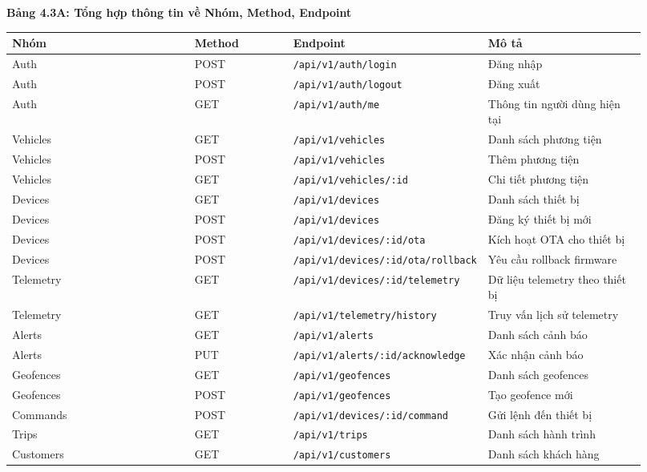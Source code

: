 \documentclass[13pt,a4paper]{extarticle}
\newcounter{none} %
\newcommand{\thesislongtableorignewline}{}
\let\thesislongtableorignewline\\
\renewcommand{\\}{\thesislongtableorignewline\hline}%
\let\\\thesislongtableorignewline
\newcommand{\thesistabletitle}[1]{%
  \begin{center}\textbf{#1}\end{center}%
}
\begin{document}
{\def\LTcaptype{none} %
\thesistabletitle{Bảng 4.3A: Tổng hợp thông tin về Nhóm, Method, Endpoint}

\begin{longtable}{|p{0.30\linewidth}|p{0.16\linewidth}|p{0.20\linewidth}|p{0.26\linewidth}|}
\hline \textbf{Nhóm} & \textbf{Method} & \textbf{Endpoint} & \textbf{Mô tả} \\
\hline
\endhead
\hline
\endlastfoot
Auth & POST & \texttt{/api/v1/auth/login} & Đăng nhập \\
Auth & POST & \texttt{/api/v1/auth/logout} & Đăng xuất \\
Auth & GET & \texttt{/api/v1/auth/me} & Thông tin người dùng hiện tại \\
Vehicles & GET & \texttt{/api/v1/vehicles} & Danh sách phương tiện \\
Vehicles & POST & \texttt{/api/v1/vehicles} & Thêm phương tiện \\
Vehicles & GET & \texttt{/api/v1/vehicles/:id} & Chi tiết phương tiện \\
Devices & GET & \texttt{/api/v1/devices} & Danh sách thiết bị \\
Devices & POST & \texttt{/api/v1/devices} & Đăng ký thiết bị mới \\
Devices & POST & \texttt{/api/v1/devices/:id/ota} & Kích hoạt OTA cho
thiết bị \\
Devices & POST & \nolinkurl{/api/v1/devices/:id/ota/rollback} & Yêu cầu
rollback firmware \\
Telemetry & GET & \nolinkurl{/api/v1/devices/:id/telemetry} & Dữ liệu
telemetry theo thiết bị \\
Telemetry & GET & \texttt{/api/v1/telemetry/history} & Truy vấn lịch sử
telemetry \\
Alerts & GET & \texttt{/api/v1/alerts} & Danh sách cảnh báo \\
Alerts & PUT & \nolinkurl{/api/v1/alerts/:id/acknowledge} & Xác nhận cảnh
báo \\
Geofences & GET & \texttt{/api/v1/geofences} & Danh sách geofences \\
Geofences & POST & \texttt{/api/v1/geofences} & Tạo geofence mới \\
Commands & POST & \nolinkurl{/api/v1/devices/:id/command} & Gửi lệnh đến
thiết bị \\
Trips & GET & \texttt{/api/v1/trips} & Danh sách hành trình \\
Customers & GET & \texttt{/api/v1/customers} & Danh sách khách hàng \\
\end{longtable}
}
\end{document}
